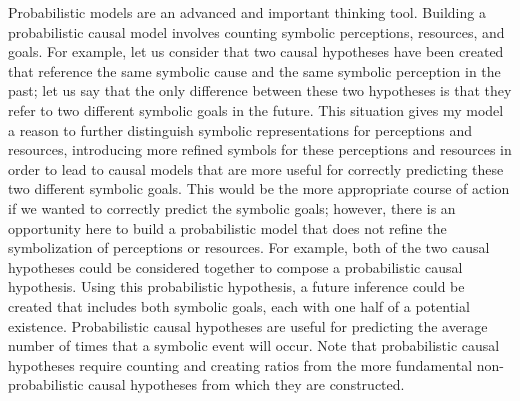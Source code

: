 Probabilistic models are an advanced and important thinking tool.
Building a probabilistic causal model involves counting symbolic
perceptions, resources, and goals.  For example, let us consider that
two causal hypotheses have been created that reference the same
symbolic cause and the same symbolic perception in the past; let us
say that the only difference between these two hypotheses is that they
refer to two different symbolic goals in the future.  This situation
gives my model a reason to further distinguish symbolic
representations for perceptions and resources, introducing more
refined symbols for these perceptions and resources in order to lead
to causal models that are more useful for correctly predicting these
two different symbolic goals.  This would be the more appropriate
course of action if we wanted to correctly predict the symbolic goals;
however, there is an opportunity here to build a probabilistic model
that does not refine the symbolization of perceptions or resources.
For example, both of the two causal hypotheses could be considered
together to compose a probabilistic causal hypothesis.  Using this
probabilistic hypothesis, a future inference could be created that
includes both symbolic goals, each with one half of a potential
existence.  Probabilistic causal hypotheses are useful for predicting
the average number of times that a symbolic event will occur.  Note
that probabilistic causal hypotheses require counting and creating
ratios from the more fundamental non-probabilistic causal hypotheses
from which they are constructed.


